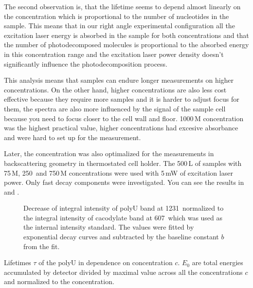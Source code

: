The second observation is, that the lifetime seems to depend almost linearly on
the concentration which is proportional to the number of nucleotides in the
sample. This means that in our right angle experimental configuration all the
excitation laser energy is absorbed in the sample for both concentrations and
that the number of photodecomposed molecules is proportional to the absorbed
energy in this concentration range and the excitation laser power density
doesn't significantly influence the photodecomposition process.

This analysis means that samples can endure longer measurements on higher
concentrations. On the other hand, higher concentrations are also less cost
effective because they require more samples and it is harder to adjust focus
for them, the spectra are also more influenced by the signal of the sample cell
because you need to focus closer to the cell wall and floor. 1000\,M
concentration was the highest practical value, higher concentrations had
excesive absorbance and were hard to set up for the measurement.

Later,
the concentration was also optimalized for the measurements in backscattering
geometry in thermostated cell holder. The 500\,L of samples with
75\,M, 250\, and 750\,M concentrations were used with 5\,mW of
excitation laser power. Only fast decay components were investigated. You can
see the results in
and
.

\begin{figure}
	\centering
	
	\caption{Decrease of integral intensity of polyU band at 1231\,\icm{}
		normalized to the integral intensity of cacodylate band at 607\,\icm{}
		which was used as the internal intensity standard. The values were fitted
		by exponential decay curves  and subtracted
		by the baseline constant $b$ from the fit.}
	\label{\figlabel{conc_optim:hairpins}}
\end{figure}

\begin{table}
	\centering
	
	\caption{Lifetimes $\tau$ of the polyU in dependence on concentration
		$c$. $E_0$ are total energies accumulated by detector divided by maximal
		value across all the concentrations $c$ and normalized to the
		concentration.
	}
	\label{\tablabel{conc_optim:lifetimes_hairpins}}
\end{table}

